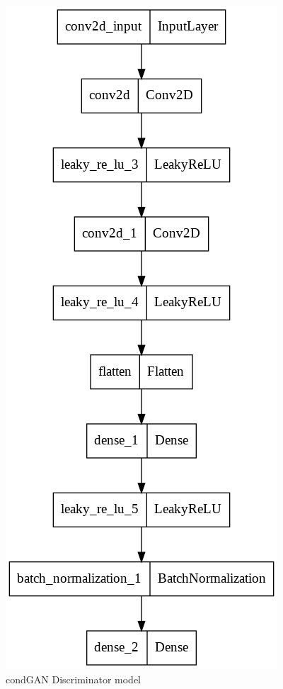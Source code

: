 \documentclass[conference]{IEEEtran}
\begin{document}
\begin{figure}[h]
\centering
\includegraphics[scale = 0.25]{condGAN_disc_model.png}
  \caption{condGAN Discriminator model}
\end{figure}
\end{document}
